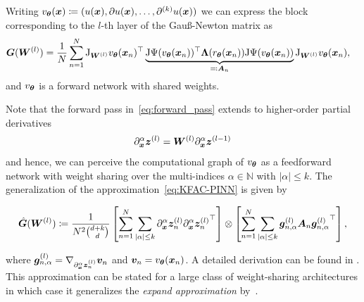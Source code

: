 Writing $v_\vtheta(\vx)\coloneqq (%
u(\vx), \partial u(\vx), \dots, \partial^{(k)} u(\vx))$
we can express the block corresponding to the $l$-th layer of the Gauß-Newton matrix as 
\begin{align}
    {\bm{G}}({\bm{W}}^{(l)}) & = \frac1N\sum_{n=1}^N \mathrm{J}_{{\bm{W}}^{(l)}} v_{\bm{\theta}}({\bm{x}}_n)^\top \underbrace{\mathrm{J} \Psi(v_{\bm{\theta}}({\bm{x}}_n))^\top {\bm{\Lambda}}(r_{\bm{\theta}}({\bm{x}}_n)) \mathrm{J} \Psi(v_{\bm{\theta}}({\bm{x}}_n))}_{\eqqcolon {\bm{A}}_n}  \mathrm{J}_{{\bm{W}}^{(l)}} v_{\bm{\theta}}({\bm{x}}_n),
\end{align}
and $v_{\bm{\theta}}$ is a forward network with shared weights.

Note that the forward pass in~\eqref{eq:forward_pass} extends to higher-order partial derivatives 
\begin{align}
    \partial_{\bm{x}}^\alpha {\bm{z}}^{(l)} = {\bm{W}}^{(l)}\partial_{\bm{x}}^\alpha {\bm{z}}^{(l-1)} 
\end{align}
and hence, we can perceive the computational graph of $v_{\bm{\theta}}$ as a feedforward network with weight sharing over the multi-indices $\alpha\in\mathbb N$ with $\lvert \alpha \rvert \le k$.
The generalization of the approximation~\eqref{eq:KFAC-PINN} is given by 
\begin{tcolorbox}[colframe=kfac, title={KFAC for Gauß-Newton with general PDE terms},bottom=0mm,top=0mm,middle=0mm]
\begin{align}\label{eq:KFAC-PINNs-general}
    \hat{\mG}%
    (\mW^{(l)})
    \coloneqq \frac{1}{N^2 \binom{d+k}{d}}
    \left[\sum_{n=1}^N \sum_{\lvert \alpha \rvert \le k} %
    \partial_\vx^\alpha \vz_n^{(l)} {\partial_\vx^\alpha \vz_n^{(l)}}^\top\right]
    \otimes
    \left[\sum_{n=1}^N\sum_{\lvert \alpha \rvert \le k} \vg^{(l)}_{n,\alpha} \mA_n {\vg^{(l)}_{n,\alpha}}^\top   \right],
\end{align}
\end{tcolorbox}


where ${\bm{g}}^{(l)}_{n,\alpha} = \nabla_{\partial_{\bm{x}}^\alpha {\bm{z}}_n^{(l)}} {\bm{v}}_n$ and $\vv_n = v_\vtheta(\vx_n) %
$. 
A detailed derivation can be found in .
%
This approximation can be stated for a large class of weight-sharing architectures in which case it generalizes the \emph{expand approximation} by~\citet{eschenhagen2023kroneckerfactored}. 

